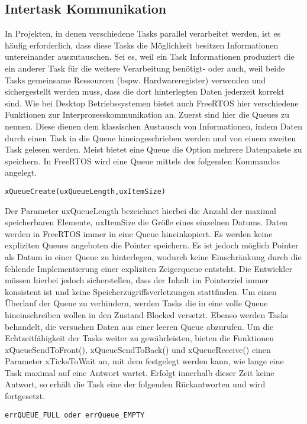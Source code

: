 \subsection{Intertask Kommunikation}
In Projekten, in denen verschiedene Tasks parallel verarbeitet werden, ist es häufig erforderlich, dass diese Tasks die Möglichkeit besitzen Informationen untereinander auszutauschen. Sei es, weil ein Task Informationen produziert die ein anderer Task für die weitere Verarbeitung benötigt- oder auch, weil beide Tasks gemeinsame Ressourcen (bspw. Hardwareregister) verwenden und sichergestellt werden muss, dass die dort hinterlegten Daten jederzeit korrekt sind. Wie bei Desktop Betriebssystemen bietet auch FreeRTOS hier verschiedene Funktionen zur Interprozesskommunikation an. Zuerst sind hier die Queues zu nennen. Diese dienen dem klassischen Austausch von Informationen, indem Daten durch einen Task in die Queue hineingeschrieben werden und von einem zweiten Task gelesen werden. Meist bietet eine Queue die Option mehrere Datenpakete zu speichern. In FreeRTOS wird eine Queue mittels des folgenden Kommandos angelegt. 
\begin{lstlisting}[numbers = none]
xQueueCreate(uxQueueLength,uxItemSize)
\end{lstlisting}
Der Parameter uxQueueLength bezeichnet hierbei die Anzahl der maximal speicherbaren Elemente, uxItemSize die Größe eines einzelnen Datums. Daten werden in FreeRTOS immer in eine Queue hineinkopiert. 
Es werden keine expliziten Queues angeboten die Pointer speichern. Es ist jedoch möglich Pointer als Datum in einer Queue zu hinterlegen, wodurch keine Einschränkung durch die fehlende Implementierung einer expliziten Zeigerqueue entsteht. Die Entwickler müssen hierbei jedoch sicherstellen, dass der Inhalt im Pointerziel immer konsistent ist und keine Speicherzugriffsverletzungen stattfinden.
Um einen Überlauf der Queue zu verhindern, werden Tasks die in eine volle Queue hineinschreiben wollen in den Zustand Blocked versetzt. Ebenso werden Tasks behandelt, die versuchen Daten aus einer leeren Queue abzurufen. Um die Echtzeitfähigkeit der Tasks weiter zu gewährleisten, bieten die Funktionen xQueueSendToFront(), xQueueSendToBack() und xQueueReceive() einen Parameter xTicksToWait an, mit dem festgelegt werden kann, wie lange eine Task maximal auf eine Antwort wartet. Erfolgt innerhalb dieser Zeit keine Antwort, so erhält die Task eine der folgenden Rückantworten und wird fortgesetzt. 
\begin{lstlisting}[numbers = none]
errQUEUE_FULL oder errQueue_EMPTY
\end{lstlisting}
